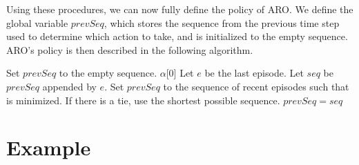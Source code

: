 \documentclass[letterpaper]{article} %
\begin{document}
Using these procedures, we can now fully define the policy of ARO. We
define the global variable $prevSeq$, which stores the sequence
from the previous time step used to determine which action to take,
and is initialized to the empty sequence. ARO's policy is then
described in the following algorithm.
\filbreak
\begin{algorithmic}[1]
			\State Set $prevSeq$ to the empty sequence.
			\State \Return $\alpha$[0]
		\EndIf
		\State Let $e$ be the last episode.
		\State Let $seq$ be $prevSeq$ appended by $e$.
			\State Set $prevSeq$ to the sequence of recent episodes such that  is minimized.
			\State If there is a tie, use the shortest possible sequence.
		\Else
			\State $prevSeq = seq$
		\EndIf
        \State \Return {}
	\EndFunction
	
\end{algorithmic}


\section{Example}
\end{document}
